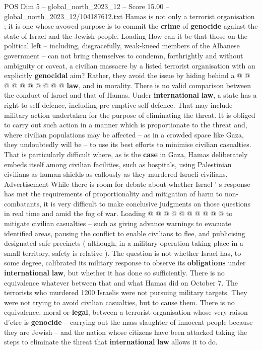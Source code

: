 \begin{textsample}{POS Dim 5 – global\_north\_2023\_12 – Score 15.00 – global\_north\_2023\_12/104187612.txt}
Hamas is not only a terrorist organisation ; it is one whose avowed purpose is to commit the \textbf{crime} of \textbf{genocide} against the state of Israel and the Jewish people.
Loading How can it be that those on the political left -- including, disgracefully, weak-kneed members of the Albanese government -- can not bring themselves to condemn, forthrightly and without ambiguity or caveat, a civilian massacre by a listed terrorist organisation with an explicitly \textbf{genocidal} aim?
Rather, they avoid the issue by hiding behind a @ @ @ @ @ @ @ @ @ @ \textbf{law}, and in morality.
There is no valid comparison between the conduct of Israel and that of Hamas.
Under \textbf{international} \textbf{law}, a state has a right to self-defence, including pre-emptive self-defence.
That may include military action undertaken for the purpose of eliminating the threat.
It is obliged to carry out such action in a manner which is proportionate to the threat and, where civilian populations may be affected -- as in a crowded space like Gaza, they undoubtedly will be -- to use its best efforts to minimise civilian casualties.
That is particularly difficult where, as is the \textbf{case} in Gaza, Hamas deliberately embeds itself among civilian facilities, such as hospitals, using Palestinian civilians as human shields as callously as they murdered Israeli civilians.
Advertisement While there is room for debate about whether Israel ' s response has met the requirements of proportionality and mitigation of harm to non-combatants, it is very difficult to make conclusive judgments on those questions in real time and amid the fog of war.
Loading @ @ @ @ @ @ @ @ @ @ to mitigate civilian casualties -- such as giving advance warnings to evacuate identified areas, pausing the conflict to enable civilians to flee, and publicising designated safe precincts ( although, in a military operation taking place in a small territory, safety is relative ).
The question is not whether Israel has, to some degree, calibrated its military response to observe its \textbf{obligations} under \textbf{international} \textbf{law}, but whether it has done so sufficiently.
There is no equivalence whatever between that and what Hamas did on October 7.
The terrorists who murdered 1200 Israelis were not pursuing military targets.
They were not trying to avoid civilian casualties, but to cause them.
There is no equivalence, moral or \textbf{legal}, between a terrorist organisation whose very raison d'etre is \textbf{genocide} -- carrying out the mass slaughter of innocent people because they are Jewish -- and the nation whose citizens have been attacked taking the steps to eliminate the threat that \textbf{international} \textbf{law} allows it to do.

\end{textsample}
